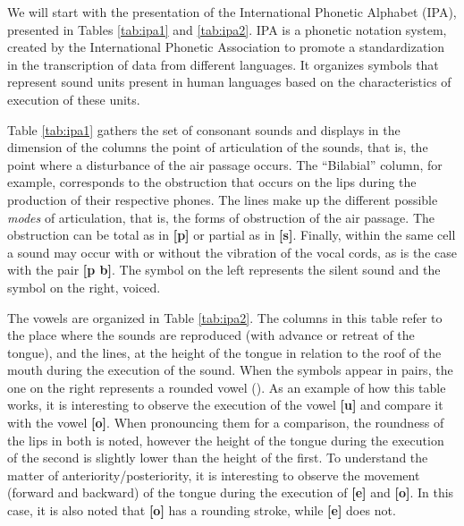 We will start with the presentation of the International Phonetic Alphabet (IPA), presented in Tables \ref{tab:ipa1} and \ref{tab:ipa2}. IPA is a phonetic notation system, created by the International Phonetic Association to promote a standardization in the transcription of data from different languages. It organizes symbols that represent sound units present in human languages based on the characteristics of execution of these units.


Table \ref{tab:ipa1} gathers the set of consonant sounds and displays in the dimension of the columns the point of articulation of the sounds, that is, the point where a disturbance of the air passage occurs. The “Bilabial” column, for example, corresponds to the obstruction that occurs on the lips during the production of their respective phones. The lines make up the different possible \textit{modes} of articulation, that is, the forms of obstruction of the air passage. The obstruction can be total as in \textbf{[p]} or partial as in \textbf{[s]}. Finally, within the same cell a sound may occur with or without the vibration of the vocal cords, as is the case with the pair \textbf{[p b]}. The symbol on the left represents the silent sound and the symbol on the right, voiced.

The vowels are organized in Table \ref{tab:ipa2}. The columns in this table refer to the place where the sounds are reproduced (with advance or retreat of the tongue), and the lines, at the height of the tongue in relation to the roof of the mouth during the execution of the sound. When the symbols appear in pairs, the one on the right represents a rounded vowel (\cite{paraconhecer:2015}). As an example of how this table works, it is interesting to observe the execution of the vowel \textbf{[u]} and compare it with the vowel \textbf{[o]}. When pronouncing them for a comparison, the roundness of the lips in both is noted, however the height of the tongue during the execution of the second is slightly lower than the height of the first. To understand the matter of anteriority/posteriority, it is interesting to observe the movement (forward and backward) of the tongue during the execution of \textbf{[e]} and \textbf{[o]}. In this case, it is also noted that \textbf{[o]} has a rounding stroke, while \textbf{[e]} does not.

